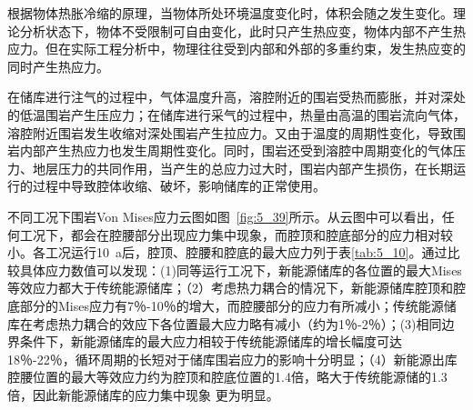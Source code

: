 根据物体热胀冷缩的原理，当物体所处环境温度变化时，体积会随之发生变化。理论分析状态下，物体不受限制可自由变化，此时只产生热应变，物体内部不产生热应力。但在实际工程分析中，物理往往受到内部和外部的多重约束，发生热应变的同时产生热应力。

在储库进行注气的过程中，气体温度升高，溶腔附近的围岩受热而膨胀，并对深处的低温围岩产生压应力；在储库进行采气的过程中，热量由高温的围岩流向气体，溶腔附近围岩发生收缩对深处围岩产生拉应力。又由于温度的周期性变化，导致围岩内部产生热应力也发生周期性变化。同时，围岩还受到溶腔中周期变化的气体压力、地层压力的共同作用，当产生的总应力过大时，围岩内部产生损伤，在长期运行的过程中导致腔体收缩、破坏，影响储库的正常使用\cite{解宁2019地下盐穴储气库盐岩热损伤机理}。

不同工况下围岩Von Mises应力云图如图~\ref{fig:5_39}所示。从云图中可以看出，任何工况下，都会在腔腰部分出现应力集中现象，而腔顶和腔底部分的应力相对较小。各工况运行\SI{10}{a}后，腔顶、腔腰和腔底的最大应力列于表\ref{tab:5_10}。通过比较具体应力数值可以发现：(1)同等运行工况下，新能源储库的各位置的最大Mises等效应力都大于传统能源储库；（2）考虑热力耦合的情况下，新能源储库腔顶和腔底部分的Mises应力有7％-10％的增大，而腔腰部分的应力有所减小；传统能源储库在考虑热力耦合的效应下各位置最大应力略有减小（约为1％-2％）；(3)相同边界条件下，新能源储库的最大应力相较于传统能源储库的增长幅度可达18％-22％，循环周期的长短对于储库围岩应力的影响十分明显；（4）新能源出库腔腰位置的最大等效应力约为腔顶和腔底位置的1.4倍，略大于传统能源储的1.3倍，因此新能源储库的应力集中现象
更为明显。%


